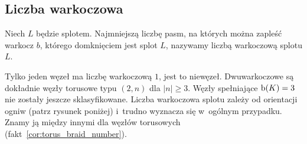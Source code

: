 
\subsection{Liczba warkoczowa}
%

\begin{definition}
\label{def:braid_number}%
    Niech $L$ będzie splotem.
    Najmniejszą liczbę pasm, na których można zapleść warkocz $b$, którego domknięciem jest splot $L$, nazywamy liczbą warkoczową splotu $L$.
\end{definition}

Tylko jeden węzeł ma liczbę warkoczową $1$, jest to niewęzeł.
Dwuwarkoczowe są dokładnie węzły torusowe typu $(2, n)$ dla $|n| \ge 3$.
Węzły spełniające $\operatorname{b} (K) = 3$ nie zostały jeszcze sklasyfikowane.
Liczba warkoczowa splotu zależy od orientacji ogniw (patrz rysunek poniżej) i~trudno wyznacza się w~ogólnym przypadku.
Znamy ją między innymi dla węzłów torusowych (fakt~\ref{cor:torus_braid_number}).

